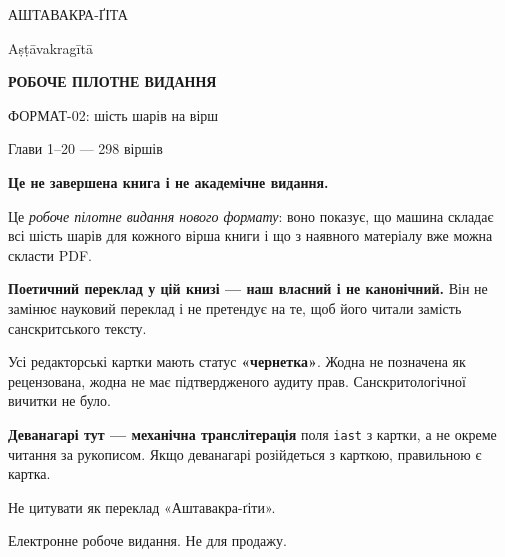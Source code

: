 \documentclass[10pt,a5paper,openany]{book}
\begin{document}
\begin{titlepage}
\centering
\vspace*{1.6cm}

{\sffamily\Large АШТАВАКРА-ҐІТА\par}
\vspace{0.5em}
{\sffamily\small Aṣṭāvakragītā\par}

\vspace{1.6cm}
{\sffamily\bfseries\large РОБОЧЕ ПІЛОТНЕ ВИДАННЯ\par}
\vspace{0.5em}
{\sffamily ФОРМАТ-02: шість шарів на вірш\par}
\vspace{0.3em}
{\sffamily Глави 1–20 — 298 віршів\par}

\vspace{1.4cm}
\begin{minipage}{0.86\textwidth}
\small\raggedright
\textbf{Це не завершена книга і не академічне видання.}

\vspace{0.5em}
Це \emph{робоче пілотне видання нового формату}: воно показує, що машина
складає всі шість шарів для кожного вірша книги і що з наявного матеріалу
вже можна скласти PDF.

\vspace{0.5em}
\textbf{Поетичний переклад у цій книзі — наш власний і не канонічний.}
Він не замінює науковий переклад і не претендує на те, щоб його читали
замість санскритського тексту.

\vspace{0.5em}
Усі редакторські картки мають статус \textbf{«чернетка»}. Жодна не позначена
як рецензована, жодна не має підтвердженого аудиту прав. Санскритологічної
вичитки не було.

\vspace{0.5em}
\textbf{Деванагарі тут — механічна транслітерація} поля \texttt{iast} з картки,
а не окреме читання за рукописом. Якщо деванагарі розійдеться з карткою,
правильною є картка.

\vspace{0.5em}
Не цитувати як переклад «Аштавакра-ґіти».
\end{minipage}

\vfill
{\sffamily\footnotesize Електронне робоче видання. Не для продажу.\par}
\end{titlepage}
\end{document}
